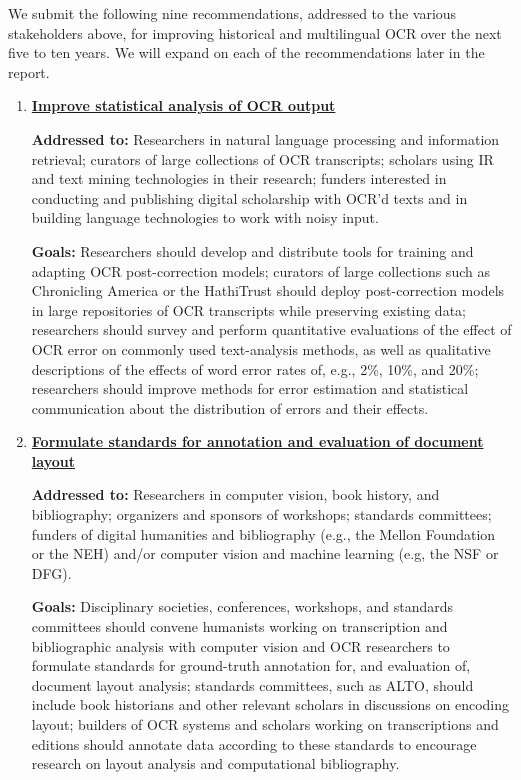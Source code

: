 \documentclass[twoside,11pt]{report}
\begin{document}
We submit the following nine recommendations, addressed to the various stakeholders above, for improving historical and multilingual OCR over the next five to ten years. We will expand on each of the recommendations later in the report.
\begin{enumerate}

\item \hyperref[sec:rec-stats]{\textbf{Improve statistical analysis of OCR output}}

\textbf{Addressed to:} Researchers in natural language processing and information retrieval; curators of large collections of OCR transcripts; scholars using IR and text mining technologies in their research; funders interested in conducting and publishing digital scholarship with OCR'd texts and in building language technologies to work with noisy input.

\textbf{Goals:} Researchers should develop and distribute tools for training and adapting OCR post-correction models; curators of large collections such as Chronicling America or the HathiTrust should deploy post-correction models in large repositories of OCR transcripts while preserving existing data; researchers should survey and perform quantitative evaluations of the effect of OCR error on commonly used text-analysis methods, as well as qualitative descriptions of the effects of word error rates of, e.g., 2\%, 10\%, and 20\%; researchers should improve methods for error estimation and statistical communication about the distribution of errors and their effects.

\item \hyperref[sec:rec-layout]{\textbf{Formulate standards for annotation and evaluation of document layout}}

\textbf{Addressed to:} Researchers in computer vision, book history, and bibliography; organizers and sponsors of workshops; standards committees; funders of digital humanities and bibliography (e.g., the Mellon Foundation or the NEH) and/or computer vision and machine learning (e.g, the NSF or DFG).

\textbf{Goals:} Disciplinary societies, conferences, workshops, and standards committees should convene humanists working on transcription and bibliographic analysis with computer vision and OCR researchers to formulate standards for ground-truth annotation for, and evaluation of, document layout analysis; standards committees, such as ALTO, should include book historians and other relevant scholars in discussions on encoding layout; builders of OCR systems and scholars working on transcriptions and editions should annotate data according to these standards to encourage research on layout analysis and computational bibliography.


\end{enumerate}
\end{document}
